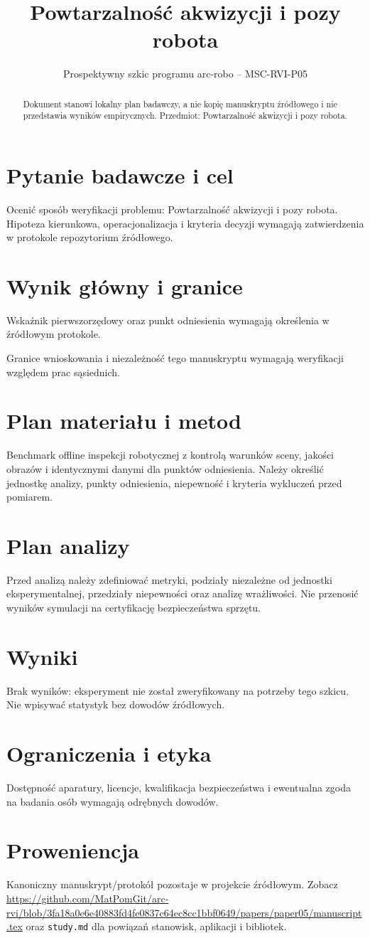 \documentclass[11pt,a4paper]{article}
\title{Powtarzalność akwizycji i pozy robota}
\author{}
\date{Prospektywny szkic programu arc-robo -- MSC-RVI-P05}
\begin{document}
\maketitle
\begin{abstract}
Dokument stanowi lokalny plan badawczy, a nie kopię manuskryptu źródłowego i nie przedstawia wyników empirycznych. Przedmiot: Powtarzalność akwizycji i pozy robota.
\end{abstract}
\section{Pytanie badawcze i cel}
Ocenić sposób weryfikacji problemu: Powtarzalność akwizycji i pozy robota. Hipoteza kierunkowa, operacjonalizacja i kryteria decyzji wymagają zatwierdzenia w protokole repozytorium źródłowego.
\section{Wynik główny i granice}
Wskaźnik pierwszorzędowy oraz punkt odniesienia wymagają określenia w źródłowym protokole.

Granice wnioskowania i niezależność tego manuskryptu wymagają weryfikacji względem prac sąsiednich.
\section{Plan materiału i metod}
Benchmark offline inspekcji robotycznej z kontrolą warunków sceny, jakości obrazów i identycznymi danymi dla punktów odniesienia. Należy określić jednostkę analizy, punkty odniesienia, niepewność i kryteria wykluczeń przed pomiarem.
\section{Plan analizy}
Przed analizą należy zdefiniować metryki, podziały niezależne od jednostki eksperymentalnej, przedziały niepewności oraz analizę wrażliwości. Nie przenosić wyników symulacji na certyfikację bezpieczeństwa sprzętu.
\section{Wyniki}
Brak wyników: eksperyment nie został zweryfikowany na potrzeby tego szkicu. Nie wpisywać statystyk bez dowodów źródłowych.
\section{Ograniczenia i etyka}
Dostępność aparatury, licencje, kwalifikacja bezpieczeństwa i ewentualna zgoda na badania osób wymagają odrębnych dowodów.
\section{Proweniencja}
Kanoniczny manuskrypt/protokół pozostaje w projekcie źródłowym. Zobacz \url{https://github.com/MatPomGit/arc-rvi/blob/3fa18a0e6e40883fd4fe0837c64ec8cc1bbf0649/papers/paper05/manuscript.tex} oraz \texttt{study.md} dla powiązań stanowisk, aplikacji i bibliotek.
\end{document}

